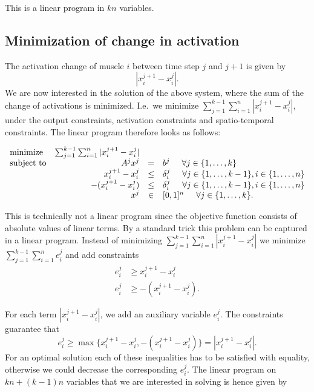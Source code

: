 This is a linear program in $kn$ variables.




\subsection{Minimization of change in activation} %
\label{sub:minimization_of_change_in_activation}
The activation change of muscle $i$ between time step $j$ and $j+1$ is given by
\[|x_i^{j+1} - x_i^{j}|.\]
We are now interested in the solution of the above system, where the sum of the change of activations is minimized. I.e.\ we minimize $\sum_{j=1}^{k-1}\sum_{i=1}^n |x_i^{j+1} - x_i^{j}|$, under the output constraints, activation constraints and spatio-temporal constraints. The linear program therefore looks as follows:

\begin{equation}
\begin{array}{lrcl}
\mbox{minimize} & \sum_{j=1}^{k-1} \sum_{i=1}^n |x_i^{j+1} - x_i^{j}| \\ 
\mbox{subject to} & A^j x^j &=& b^j \hspace{5mm} \forall j \in \{1,\dots, k\} \\
  & x_i^{j+1} - x_i^{j} &\leq& \delta_i^j  \hspace{5mm} \forall j \in \{1,\dots, k-1\}, i \in \{1,\dots,n\} \\
  &  -(x_i^{j+1} - x_i^{j}) &\leq& \delta_i^j  \hspace{5mm} \forall j \in \{1,\dots, k-1\}, i \in \{1,\dots,n\} \\
  & x^j &\in& [0,1]^n \hspace{5mm} \forall j \in \{1,\dots, k\}.
\end{array}
\end{equation}

This is technically not a linear program since the objective function consists of absolute values of linear terms. By a standard trick this problem can be captured in a linear program. Instead of minimizing $\sum_{j=1}^{k-1} \sum_{i=1}^n |x_i^{j+1} - x_i^{j}|$ we minimize $\sum_{j=1}^{k-1} \sum_{i=1}^n e_i^j$ and add constraints 
\begin{align*}
e_i^j &\geq x_i^{j+1} - x_i^{j} \\
e_i^j &\geq - (x_i^{j+1} - x_i^{j}).
\end{align*}

For each term $|x_i^{j+1} - x_i^{j}|$, we add an auxiliary variable $e_i^j$. The constraints guarantee that 
\[e_i^j \geq \max\{x_i^{j+1} - x_i^{j}, - (x_i^{j+1} - x_i^{j})\} = |x_i^{j+1} - x_i^{j}|.\]
For an optimal solution each of these inequalities has to be satisfied with equality, otherwise we could decrease the corresponding $e_i^j$. The linear program on $kn + (k-1)n$ variables that we are interested in solving is hence given by

